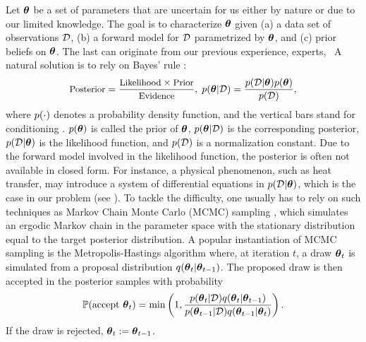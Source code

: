Let ${\boldsymbol\theta}$ be a set of parameters that are uncertain for us either by nature or due to our limited knowledge. The goal is to characterize ${\boldsymbol\theta}$ given (a) a data set of observations $\mathcal{D}$, (b) a forward model for $\mathcal{D}$ parametrized by ${\boldsymbol\theta}$, and (c) prior beliefs on ${\boldsymbol\theta}$. The last can originate from our previous experience, experts, \etc\ A natural solution is to rely on Bayes' rule \cite{gelman2004}:
\[
  \text{\small Posterior} = \frac{\text{\small Likelihood} \times \text{\small Prior}}{\text{\small Evidence}}, \; \f{\vparam | \Data} = \frac{\f{\Data | \vparam} \f{\vparam}}{\f{\Data}},
\]
where $\f{\cdot}$ denotes a probability density function, and the vertical bars stand for conditioning \cite{durrett2010}. $\f{\vparam}$ is called the prior of ${\boldsymbol\theta}$, $\f{\vparam | \Data}$ is the corresponding posterior, $\f{\Data | \vparam}$ is the likelihood function, and $\f{\Data}$ is a normalization constant.
Due to the forward model involved in the likelihood function, the posterior is often not available in closed form.
For instance, a physical phenomenon, such as heat transfer, may introduce a system of differential equations in $\f{\Data | \vparam}$, which is the case in our problem (see ).
To tackle the difficulty, one usually has to rely on such techniques as Markov Chain Monte Carlo (MCMC) sampling \cite{gelman2004}, which simulates an ergodic Markov chain in the parameter space with the stationary distribution equal to the target posterior distribution.
A popular instantiation of MCMC sampling is the Metropolis-Hastings algorithm where, at iteration $t$, a draw ${\boldsymbol\theta}_t$ is simulated from a proposal distribution $q({\boldsymbol\theta}_t | {\boldsymbol\theta}_{t - 1})$. The proposed draw is then accepted in the posterior samples with probability
\[
  \probabilityMeasure(\text{accept } \vparam_t) = \min\left(1, \frac{\f{\vparam_t |  \Data} q(\vparam_t | \vparam_{t - 1})}{\f{\vparam_{t - 1} | \Data} q(\vparam_{t - 1} | \vparam_t)} \right).
\]
If the draw is rejected, ${\boldsymbol\theta}_t := {\boldsymbol\theta}_{t - 1}$.
